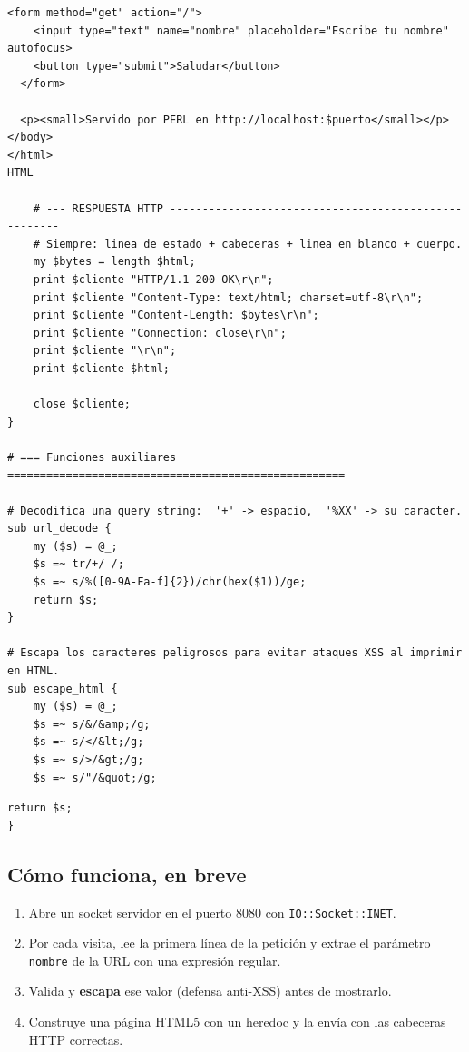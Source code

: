 \documentclass[11pt]{article}
\begin{document}
\begin{cajacodigo}
\begin{lstlisting}[style=perl]
  <form method="get" action="/">
    <input type="text" name="nombre" placeholder="Escribe tu nombre" autofocus>
    <button type="submit">Saludar</button>
  </form>

  <p><small>Servido por PERL en http://localhost:$puerto</small></p>
</body>
</html>
HTML

    # --- RESPUESTA HTTP -----------------------------------------------------
    # Siempre: linea de estado + cabeceras + linea en blanco + cuerpo.
    my $bytes = length $html;
    print $cliente "HTTP/1.1 200 OK\r\n";
    print $cliente "Content-Type: text/html; charset=utf-8\r\n";
    print $cliente "Content-Length: $bytes\r\n";
    print $cliente "Connection: close\r\n";
    print $cliente "\r\n";
    print $cliente $html;

    close $cliente;
}

# === Funciones auxiliares ====================================================

# Decodifica una query string:  '+' -> espacio,  '%XX' -> su caracter.
sub url_decode {
    my ($s) = @_;
    $s =~ tr/+/ /;
    $s =~ s/%([0-9A-Fa-f]{2})/chr(hex($1))/ge;
    return $s;
}

# Escapa los caracteres peligrosos para evitar ataques XSS al imprimir en HTML.
sub escape_html {
    my ($s) = @_;
    $s =~ s/&/&amp;/g;
    $s =~ s/</&lt;/g;
    $s =~ s/>/&gt;/g;
    $s =~ s/"/&quot;/g;
\end{lstlisting}
\end{cajacodigo}
\vspace{2pt}
\begin{cajacodigo}
\begin{lstlisting}[style=perl]
    return $s;
}
\end{lstlisting}
\end{cajacodigo}
\vspace{2pt}
\subsection{Cómo funciona, en breve}
\begin{enumerate}[leftmargin=1.6em,itemsep=2pt,topsep=2pt]
\item Abre un socket servidor en el puerto 8080 con \texttt{IO::Socket::INET}.
\item Por cada visita, lee la primera línea de la petición y extrae el parámetro \texttt{nombre} de la URL con una expresión regular.
\item Valida y \textbf{escapa} ese valor (defensa anti-XSS) antes de mostrarlo.
\item Construye una página HTML5 con un heredoc y la envía con las cabeceras HTTP correctas.
\end{enumerate}
\end{document}
